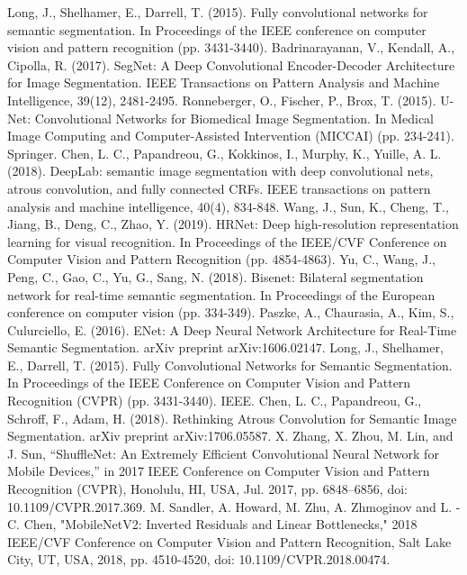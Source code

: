 \documentclass[11pt]{article}
\begin{document}
	\begin{thebibliography}{99}  
		Long, J., Shelhamer, E., Darrell, T. (2015). Fully convolutional networks for semantic segmentation. In Proceedings of the IEEE conference on computer vision and pattern recognition (pp. 3431-3440).  
		Badrinarayanan, V., Kendall, A., Cipolla, R. (2017). SegNet: A Deep Convolutional Encoder-Decoder Architecture for Image Segmentation. IEEE Transactions on Pattern Analysis and Machine Intelligence, 39(12), 2481-2495.
		Ronneberger, O., Fischer, P., Brox, T. (2015). U-Net: Convolutional Networks for Biomedical Image Segmentation. In Medical Image Computing and Computer-Assisted Intervention (MICCAI) (pp. 234-241). Springer.
		Chen, L. C., Papandreou, G., Kokkinos, I., Murphy, K., Yuille, A. L. (2018). DeepLab: semantic image segmentation with deep convolutional nets, atrous convolution, and fully connected CRFs. IEEE transactions on pattern analysis and machine intelligence, 40(4), 834-848.  
		Wang, J., Sun, K., Cheng, T., Jiang, B., Deng, C., Zhao, Y. (2019). HRNet: Deep high-resolution representation learning for visual recognition. In Proceedings of the IEEE/CVF Conference on Computer Vision and Pattern Recognition (pp. 4854-4863).  
		Yu, C., Wang, J., Peng, C., Gao, C., Yu, G., Sang, N. (2018). Bisenet: Bilateral segmentation network for real-time semantic segmentation. In Proceedings of the European conference on computer vision (pp. 334-349). 
		Paszke, A., Chaurasia, A., Kim, S., Culurciello, E. (2016). ENet: A Deep Neural Network Architecture for Real-Time Semantic Segmentation. arXiv preprint arXiv:1606.02147.
		Long, J., Shelhamer, E., Darrell, T. (2015). Fully Convolutional Networks for Semantic Segmentation. In Proceedings of the IEEE Conference on Computer Vision and Pattern Recognition (CVPR) (pp. 3431-3440). IEEE.
		Chen, L. C., Papandreou, G., Schroff, F., Adam, H. (2018). Rethinking Atrous Convolution for Semantic Image Segmentation. arXiv preprint arXiv:1706.05587.
        X. Zhang, X. Zhou, M. Lin, and J. Sun, “ShuffleNet: An Extremely Efficient Convolutional Neural Network for Mobile Devices,” in 2017 IEEE Conference on Computer Vision and Pattern Recognition (CVPR), Honolulu, HI, USA, Jul. 2017, pp. 6848–6856, doi: 10.1109/CVPR.2017.369.
        M. Sandler, A. Howard, M. Zhu, A. Zhmoginov and L. -C. Chen, "MobileNetV2: Inverted Residuals and Linear Bottlenecks," 2018 IEEE/CVF Conference on Computer Vision and Pattern Recognition, Salt Lake City, UT,                      USA, 2018, pp. 4510-4520, doi: 10.1109/CVPR.2018.00474.

\end{thebibliography}
\end{document}
